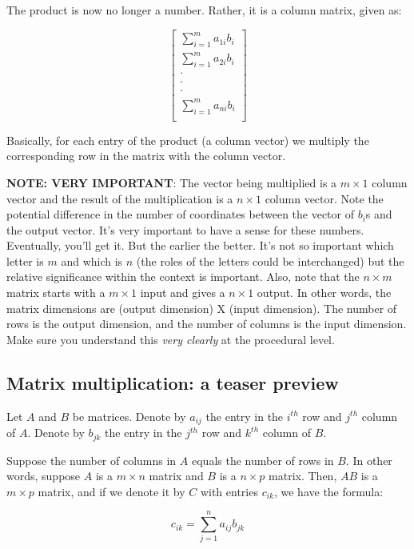 \documentclass[10pt]{amsart}
\begin{document}
The product is now no longer a number. Rather, it is a column matrix, given as:

$$\left[\begin{matrix} \sum_{i=1}^m a_{1i}b_i \\ \sum_{i=1}^m a_{2i}b_i \\ \cdot \\ \cdot \\ \cdot \\ \sum_{i=1}^m a_{ni}b_i \\\end{matrix} \right]$$

Basically, for each entry of the product (a column vector) we multiply
the corresponding row in the matrix with the column vector.

{\bf NOTE: VERY IMPORTANT}: The vector being multiplied is a $m \times
1$ column vector and the result of the multiplication is a $n \times
1$ column vector. Note the potential difference in the number of
coordinates between the vector of $b_i$s and the output vector. It's
very important to have a sense for these numbers. Eventually, you'll
get it. But the earlier the better. It's not so important which letter
is $m$ and which is $n$ (the roles of the letters could be
interchanged) but the relative significance within the context is
important. Also, note that the $n \times m$ matrix starts with a $m
\times 1$ input and gives a $n \times 1$ output. In other words, the
matrix dimensions are (output dimension) X (input dimension). The
number of rows is the output dimension, and the number of columns is
the input dimension. Make sure you understand this {\em very clearly}
at the procedural level.

\subsection{Matrix multiplication: a teaser preview}

Let $A$ and $B$ be matrices. Denote by $a_{ij}$ the entry in the
$i^{th}$ row and $j^{th}$ column of $A$. Denote by $b_{jk}$ the entry
in the $j^{th}$ row and $k^{th}$ column of $B$.

Suppose the number of columns in $A$ equals the number of rows in
$B$. In other words, suppose $A$ is a $m \times n$ matrix and $B$ is a
$n \times p$ matrix. Then, $AB$ is a $m \times p$ matrix, and if we
denote it by $C$ with entries $c_{ik}$, we have the formula:

$$c_{ik} = \sum_{j=1}^n a_{ij}b_{jk}$$
\end{document}
